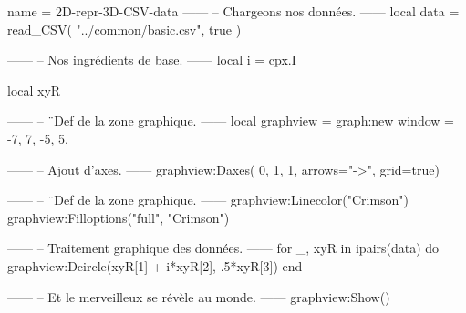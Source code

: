 \documentclass{standalone}
\begin{document}
\begin{luadraw}{name = 2D-repr-3D-CSV-data}
------
-- Chargeons nos données.
------
local data = read_CSV(
  "../common/basic.csv",
  true
)

------
-- Nos ingrédients de base.
------
local i = cpx.I

local xyR

------
-- ¨Def de la zone graphique.
------
local graphview = graph:new{
  window = {-7, 7, -5, 5},
}

------
-- Ajout d'axes.
------
graphview:Daxes(
  {0, 1, 1},
  {arrows="->",
  grid=true})

------
-- ¨Def de la zone graphique.
------
graphview:Linecolor("Crimson")
graphview:Filloptions("full", "Crimson")

------
-- Traitement graphique des données.
------
for _, xyR in ipairs(data) do
  graphview:Dcircle(xyR[1] + i*xyR[2], .5*xyR[3])
end

------
-- Et le merveilleux se révèle au monde.
------
graphview:Show()
\end{luadraw}
\end{document}
